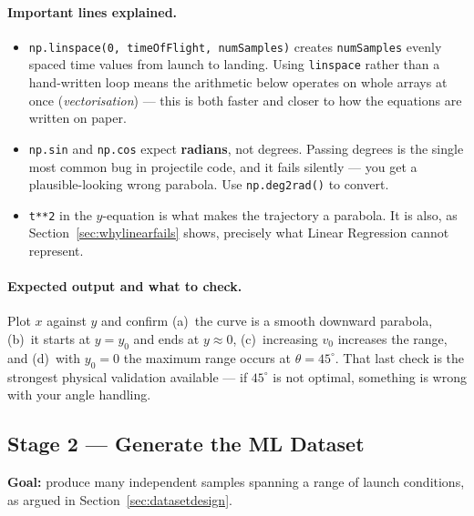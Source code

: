 \documentclass[11pt,a4paper]{article}
\newcommand{\vzero}{v_{0}}
\newcommand{\yzero}{y_{0}}
\begin{document}
\paragraph{Important lines explained.}
\begin{itemize}[leftmargin=2em,itemsep=0.2em]
  \item \texttt{np.linspace(0, timeOfFlight, numSamples)} creates \texttt{numSamples} evenly spaced
        time values from launch to landing. Using \texttt{linspace} rather than a hand-written loop
        means the arithmetic below operates on whole arrays at once (\emph{vectorisation}) --- this
        is both faster and closer to how the equations are written on paper.
  \item \texttt{np.sin} and \texttt{np.cos} expect \textbf{radians}, not degrees. Passing degrees is
        the single most common bug in projectile code, and it fails silently --- you get a
        plausible-looking wrong parabola. Use \texttt{np.deg2rad()} to convert.
  \item \texttt{t**2} in the $y$-equation is what makes the trajectory a parabola. It is also, as
        Section~\ref{sec:whylinearfails} shows, precisely what Linear Regression cannot represent.
\end{itemize}

\paragraph{Expected output and what to check.}
Plot $x$ against $y$ and confirm (a)~the curve is a smooth downward parabola, (b)~it starts at
$y=\yzero$ and ends at $y\approx0$, (c)~increasing $\vzero$ increases the range, and (d)~with
$\yzero=0$ the maximum range occurs at $\theta=45^\circ$. That last check is the strongest physical
validation available --- if $45^\circ$ is not optimal, something is wrong with your angle handling.

\subsection*{Stage 2 --- Generate the ML Dataset}

\textbf{Goal:} produce many independent samples spanning a range of launch conditions, as argued in
Section~\ref{sec:datasetdesign}.
\end{document}
